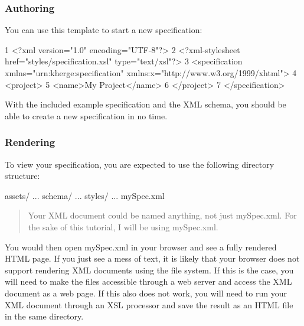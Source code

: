 \subsubsection*{Authoring}

You can use this template to start a new specification\+:


\begin{DoxyCode}
1 <?\textcolor{keyword}{xml} \textcolor{keyword}{version}=\textcolor{stringliteral}{"1.0"} \textcolor{keyword}{encoding}=\textcolor{stringliteral}{"UTF-8"}?>
2 <?\textcolor{keyword}{xml-stylesheet} \textcolor{keyword}{href}=\textcolor{stringliteral}{"styles/specification.xsl"} \textcolor{keyword}{type}=\textcolor{stringliteral}{"text/xsl"}?>
3 <\textcolor{keywordtype}{specification} \textcolor{keyword}{xmlns}=\textcolor{stringliteral}{"urn:kherge:specification"} \textcolor{keyword}{xmlns:x}=\textcolor{stringliteral}{"http://www.w3.org/1999/xhtml"}>
4   <\textcolor{keywordtype}{project}>
5     <\textcolor{keywordtype}{name}>\textcolor{keyword}{My} \textcolor{keyword}{Project}</\textcolor{keywordtype}{name}>
6   </\textcolor{keywordtype}{project}>
7 </\textcolor{keywordtype}{specification}>
\end{DoxyCode}


With the included example specification and the X\+ML schema, you should be able to create a new specification in no time.

\subsubsection*{Rendering}

To view your specification, you are expected to use the following directory structure\+: \begin{DoxyVerb}assets/
    ...
schema/
    ...
styles/
    ...
mySpec.xml
\end{DoxyVerb}


\begin{quote}
Your X\+ML document could be named anything, not just {\ttfamily my\+Spec.\+xml}. For the sake of this tutorial, I will be using {\ttfamily my\+Spec.\+xml}. \end{quote}


You would then open {\ttfamily my\+Spec.\+xml} in your browser and see a fully rendered H\+T\+ML page. If you just see a mess of text, it is likely that your browser does not support rendering X\+ML documents using the file system. If this is the case, you will need to make the files accessible through a web server and access the X\+ML document as a web page. If this also does not work, you will need to run your X\+ML document through an X\+SL processor and save the result as an H\+T\+ML file in the same directory.

